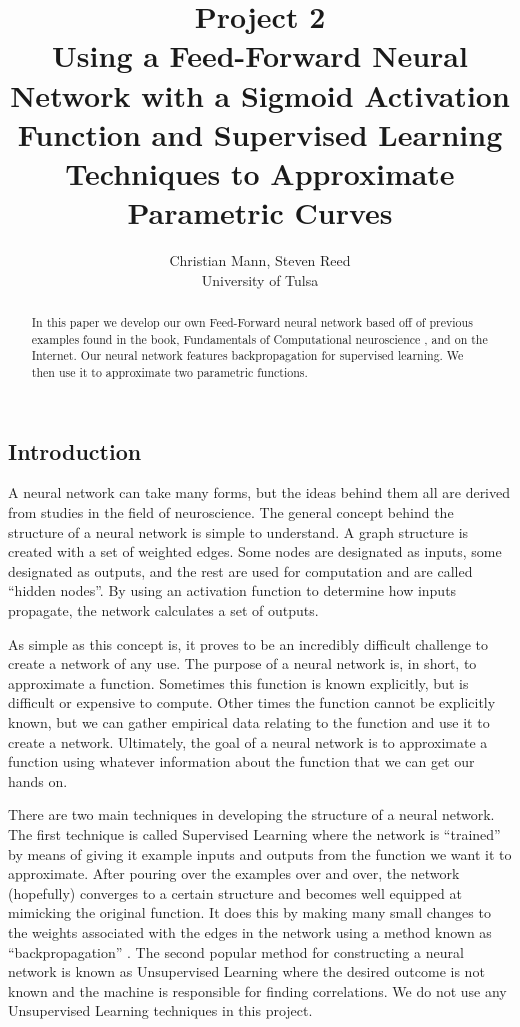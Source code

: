 \documentclass{article}
\title{Project 2\\Using a Feed-Forward Neural Network with a Sigmoid Activation Function and Supervised Learning Techniques to Approximate Parametric Curves}
\author{Christian Mann, Steven Reed \\
		University of Tulsa}
\begin{document}
\maketitle

\begin{multicols}{2}

\begin{abstract}
In this paper we develop our own Feed-Forward neural network based off of previous examples found in the book, Fundamentals of Computational neuroscience \cite{trappenberg}, and on the Internet. Our neural network features backpropagation for supervised learning. We then use it to approximate two parametric functions.
\end{abstract}

\section{Introduction}

A neural network can take many forms, but the ideas behind them all are derived from studies in the field of neuroscience. The general concept behind the structure of a neural network is simple to understand. A graph structure is created with a set of weighted edges. Some nodes are designated as inputs, some designated as outputs, and the rest are used for computation and are called ``hidden nodes''. By using an activation function to determine how inputs propagate, the network calculates a set of outputs.

As simple as this concept is, it proves to be an incredibly difficult challenge to create a network of any use. The purpose of a neural network is, in short, to approximate a function. Sometimes this function is known explicitly, but is difficult or expensive to compute. Other times the function cannot be explicitly known, but we can gather empirical data relating to the function and use it to create a network. Ultimately, the goal of a neural network is to approximate a function using whatever information about the function that we can get our hands on.

There are two main techniques in developing the structure of a neural network. The first technique is called Supervised Learning where the network is ``trained'' by means of giving it example inputs and outputs from the function we want it to approximate. After pouring over the examples over and over, the network (hopefully) converges to a certain structure and becomes well equipped at mimicking the original function. It does this by making many small changes to the weights associated with the edges in the network using a method known as ``backpropagation'' \cite{trappenberg}. The second popular method for constructing a neural network is known as Unsupervised Learning where the desired outcome is not known and the machine is responsible for finding correlations. We do not use any Unsupervised Learning techniques in this project.


\end{multicols}
\end{document}

